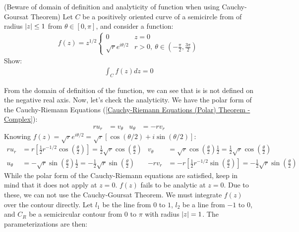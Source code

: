 \documentclass[12pt, english]{book}
\makeatletter
\renewenvironment{proof}[1][\proofname]{\par
	\pushQED{\qed}%
	\normalfont \topsep6\p@\@plus6\p@\relax
	\list{}{%
		\settowidth{\leftmargin}{\itshape\proofname:\hskip\labelsep}%
		\setlength{\labelwidth}{0pt}%
		\setlength{\itemindent}{-\leftmargin}%
		}%
	\item[\hskip\labelsep\itshape#1\@addpunct{:}]\ignorespaces
	}{\popQED\endlist\@endpefalse}
\makeatother
\begin{document}
	\begin{example}(Beware of domain of definition and analyticity of function when using Cauchy-Goursat Theorem)
		Let \(C\) be a positively oriented curve of a semicircle from of radius \(\abs{z} \leq 1\) from \(\theta \in [0, \pi]\), and consider a function:
		\begin{align*}
			f(z) = z^{1/2}
			\begin{cases}
				0 & z = 0 \\
				\sqrt{r} e^{i\theta/2} & r>0, \ \theta \in \left(-\frac{\pi}{2}, \frac{3\pi}{2}\right)
			\end{cases}
		\end{align*}
		Show:
		\begin{align*}
			\int_{C} f(z) dz = 0
		\end{align*}
		\begin{proof}
			{\color{Grey}
			From the domain of definition of the function, we can see that is is not defined on the negative real axis. Now, let's check the analyticity. We have the polar form of the Cauchy-Riemann Equations (\cref{Cauchy-Riemann Equations (Polar) Theorem - Complex}):
			\begin{align*}
				ru_r &= v_\theta &
				u_\theta &= -rv_r
			\end{align*}
			Knowing \(f(z) = \sqrt{r}e^{i\theta/2} = \sqrt{r}[\cos(\theta/2) + i \sin(\theta/2)]\):
			\begin{align*}
				r u_r &= r\left[\frac{1}{2}r^{-1/2} \cos\left(\frac{\theta}{2}\right)\right]
						= \frac{1}{2}\sqrt{r} \cos\left(\frac{\theta}{2}\right) &
				v_\theta &= \sqrt{r} \cos\left(\frac{\theta}{2}\right) \frac{1}{2} 
							= \frac{1}{2}\sqrt{r}\cos\left(\frac{\theta}{2}\right) \\
				u_\theta &= -\sqrt{r}\sin\left(\frac{\theta}{2}\right) \frac{1}{2}
							= - \frac{1}{2} \sqrt{r} \sin\left(\frac{\theta}{2}\right) &
				-rv_r &= -r \left[\frac{1}{2} r^{-1/2} \sin\left(\frac{\theta}{2}\right)\right]
						= -\frac{1}{2} \sqrt{r} \sin\left(\frac{\theta}{2}\right)
			\end{align*}
			While the polar form of the Cauchy-Riemann equations are satisfied, keep in mind that it does not apply at \(z=0\). \(f(z)\) fails to be analytic at \(z=0\). Due to these, we can not use the Cauchy-Goursat Theorem. We must integrate \(f(z)\) over the contour directly. Let \(l_1\) be the line from \(0\) to \(1\), \(l_2\) be a line from \(-1\) to \(0\), and \(C_R\) be a semicircular contour from \(0\) to \(\pi\) with radius \(\abs{z}=1\). The parameterizations are then: 
}
\end{proof}
\end{example}
\end{document}
